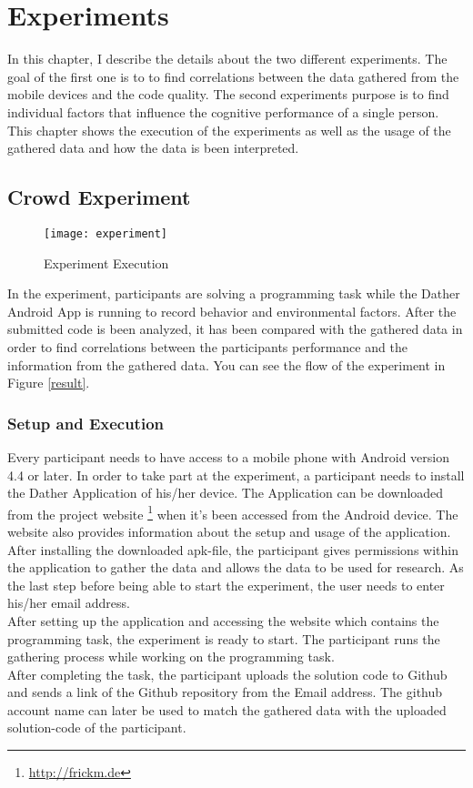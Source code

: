 \chapter{Experiments}
In this chapter, I describe the details about the two different experiments. The goal of the first one is to to find correlations between the data gathered from the mobile devices and the code quality. The second experiments purpose is to find individual factors that influence the cognitive performance of a single person. \\
This chapter shows the execution of the experiments as well as the usage of the gathered data and how the data is been interpreted. 

\section{Crowd Experiment}

\begin{figure}
\texttt{[image: experiment]}
\caption{Experiment Execution}\label{experiment}
\vspace{10 mm}
\end{figure}

In the experiment, participants are solving a programming task while the Dather Android App is running to record behavior and environmental factors. After the submitted code is been analyzed, it has been compared with the gathered data in order to find correlations between the participants performance and the information from the gathered data. You can see the flow of the experiment in Figure \ref{result}. 
\subsection{Setup and Execution}
Every participant needs to have access to a mobile phone with Android version 4.4 or later. In order to take part at the experiment, a participant needs to install the Dather Application of his/her device. The Application can be downloaded from the project website \footnote{\url{http://frickm.de}} when it's been accessed from the Android device. The website also provides information about the setup and usage of the application. 
\bigbreak
After installing the downloaded apk-file, the participant gives permissions within the application to gather the data and allows the data to be used for research. 
As the last step before being able to start the experiment, the user needs to enter his/her email address.\\
After setting up the application and accessing the website which contains the programming task, the experiment is ready to start. The participant runs the gathering process while working on the programming task.\\
After completing the task, the participant uploads the solution code to Github and sends a link of the Github repository from the Email address. The github account name can later be used to match the gathered data with the uploaded solution-code of the participant. 

